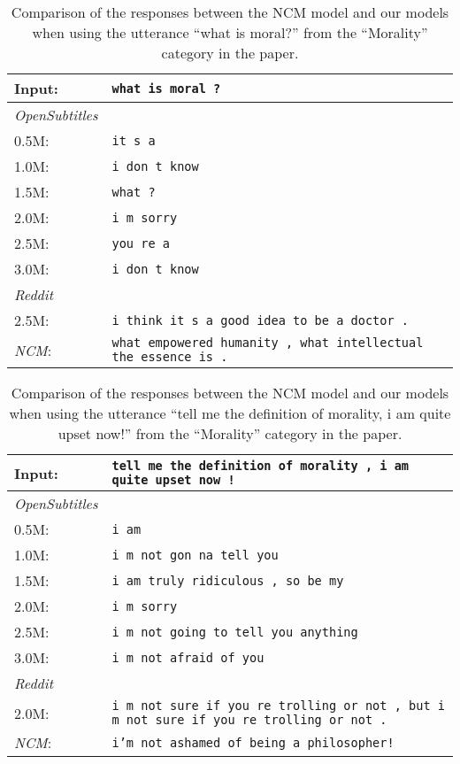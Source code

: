 \begin{table}[H]
	\centering
	\begin{adjustbox}{max width=\textwidth}
		\begin{tabularx}{\textwidth}{lX}
			\toprule
			Input: 	& \texttt{what is moral ?}\\
			\midrule
			\emph{OpenSubtitles}\\
			0.5M: 	& \texttt{it s a}\\
			1.0M: 	& \texttt{i don t know}\\
			1.5M:	& \texttt{what ?}\\
			2.0M:	& \texttt{i m sorry}\\
			2.5M:	& \texttt{you re a}\\
			3.0M:	& \texttt{i don t know}\\
			\midrule
			\emph{Reddit}\\
			2.5M:	& \texttt{i think it s a good idea to be a doctor .}\\
			\midrule
			\emph{NCM}:	& \texttt{what empowered humanity , what intellectual the essence is .}\\
			\bottomrule
		\end{tabularx}
	\end{adjustbox}
	\caption{Comparison of the responses between the NCM model and our models when using the utterance ``what is moral?'' from the ``Morality'' category in the paper.}
	\label{results:example18_output:Neural_Conversational_Model_compared}
\end{table}

\begin{table}[H]
	\centering
	\begin{adjustbox}{max width=\textwidth}
		\begin{tabularx}{\textwidth}{lX}
			\toprule
			Input: 	& \texttt{tell me the definition of morality , i am quite upset now !}\\
			\midrule
			\emph{OpenSubtitles}\\
			0.5M: 	& \texttt{i am}\\
			1.0M: 	& \texttt{i m not gon na tell you}\\
			1.5M:	& \texttt{i am truly ridiculous , so be my}\\
			2.0M:	& \texttt{i m sorry}\\
			2.5M:	& \texttt{i m not going to tell you anything}\\
			3.0M:	& \texttt{i m not afraid of you}\\
			\midrule
			\emph{Reddit}\\
			2.0M:	& \texttt{i m not sure if you re trolling or not , but i m not sure if you re trolling or not .}\\
			\midrule
			\emph{NCM}:	& \texttt{i'm not ashamed of being a philosopher!}\\
			\bottomrule
		\end{tabularx}
	\end{adjustbox}
	\caption{Comparison of the responses between the NCM model and our models when using the utterance ``tell me the definition of morality, i am quite upset now!'' from the ``Morality'' category in the paper.}
	\label{results:example19_output:Neural_Conversational_Model_compared}
\end{table}